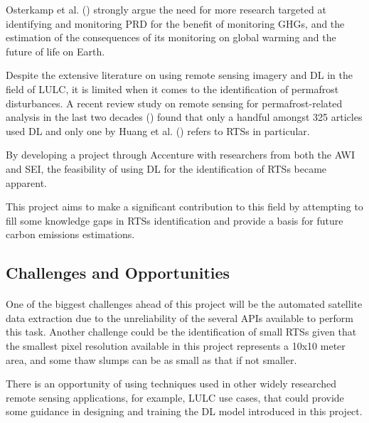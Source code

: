 Osterkamp et al. (\cite{monitoringperma}) strongly argue the need for more research targeted at identifying and monitoring \gls{PRD} for the benefit of monitoring \gls{GHGs}, and the estimation of the consequences of its monitoring on global warming and the future of life on Earth.

Despite the extensive literature on using remote sensing imagery and \gls{DL} in the field of \gls{LULC}, it is limited when it comes to the identification of permafrost disturbances.
A recent review study on remote sensing for permafrost-related analysis in the last two decades (\cite{rs13061217}) found that only a handful amongst 325 articles used \gls{DL} and only one by Huang et al. (\cite{HUANG2020111534}) refers to \gls{RTS}s in particular. 

By developing a project through Accenture with researchers from both the \gls{AWI} and \gls{SEI}, the feasibility of using \gls{DL} for the identification of \gls{RTS}s became apparent.

This project aims to make a significant contribution to this field by attempting to fill some knowledge gaps in \gls{RTS}s identification and provide a basis for future carbon emissions estimations.

\subsection{Challenges and Opportunities} \label{challenges}
\paragraph{}
One of the biggest challenges ahead of this project will be the automated satellite data extraction due to the unreliability of the several \gls{API}s available to perform this task. Another challenge could be the identification of small \gls{RTS}s given that the smallest pixel resolution available in this project represents a 10x10 meter area, and some thaw slumps can be as small as that if not smaller.

There is an opportunity of using techniques used in other widely researched remote sensing applications, for example, \gls{LULC} use cases, that could provide some guidance in designing and training the DL model introduced in this project.

